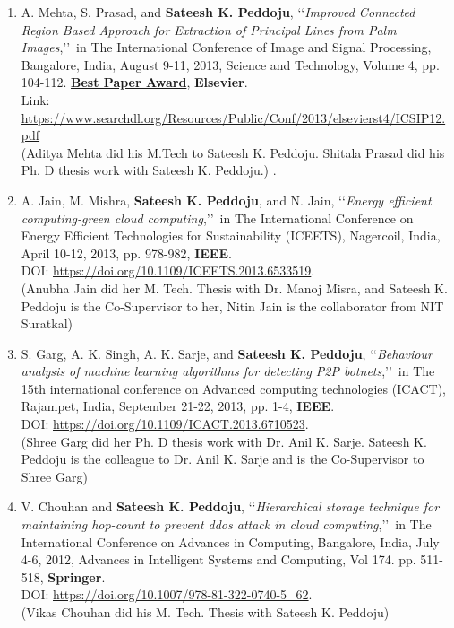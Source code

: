 \begin{enumerate}
	
	\item
	A. Mehta, S. Prasad, and  \textbf{Sateesh K. Peddoju}, \lq\lq \textit{Improved Connected Region Based Approach for Extraction of Principal Lines from Palm Images},\rq\rq\, in The International Conference of Image and Signal Processing, Bangalore, India, August 9-11, 2013, Science and Technology, Volume 4, pp. 104-112. \underline{\textbf{Best Paper Award}}, \textbf{Elsevier}. \\ Link: \url{https://www.searchdl.org/Resources/Public/Conf/2013/elsevierst4/ICSIP12.pdf} \\(Aditya Mehta did his M.Tech to Sateesh K. Peddoju. Shitala Prasad did his Ph. D thesis work with Sateesh K. Peddoju.) . 


	
	\item
	A. Jain, M. Mishra, \textbf{Sateesh K. Peddoju}, and N. Jain, \lq\lq \textit{Energy efficient computing-green cloud computing},\rq\rq\, in The International Conference on Energy Efficient Technologies for Sustainability (ICEETS), Nagercoil, India, April 10-12, 2013, pp. 978-982, \textbf{IEEE}. \\DOI: \url{https://doi.org/10.1109/ICEETS.2013.6533519}. \\(Anubha Jain did her M. Tech. Thesis with Dr. Manoj Misra, and Sateesh K. Peddoju is the Co-Supervisor to her, Nitin Jain is the collaborator from NIT Suratkal)
	
	\item
	S. Garg, A. K. Singh, A. K. Sarje, and \textbf{Sateesh K. Peddoju}, \lq\lq \textit{Behaviour analysis of machine learning algorithms for detecting P2P botnets},\rq\rq\, in The 15th international conference on Advanced computing technologies (ICACT), Rajampet, India, September 21-22, 2013, pp. 1-4,  \textbf{IEEE}. \\DOI: \url{https://doi.org/10.1109/ICACT.2013.6710523}.	\\(Shree Garg did her Ph. D thesis work with Dr. Anil K. Sarje.  Sateesh K. Peddoju is the colleague to Dr. Anil K. Sarje and is the Co-Supervisor to Shree Garg)

	
	\item
	V. Chouhan and \textbf{Sateesh K. Peddoju}, \lq\lq \textit{Hierarchical storage technique for maintaining hop-count to prevent ddos attack in cloud computing},\rq\rq\, in The International Conference on Advances in Computing, Bangalore, India, July 4-6, 2012, Advances in Intelligent Systems and Computing, Vol 174. pp. 511-518, \textbf{Springer}. \\DOI: \url{https://doi.org/10.1007/978-81-322-0740-5_62}. \\(Vikas Chouhan did his M. Tech. Thesis with Sateesh K. Peddoju)
	

\end{enumerate}

